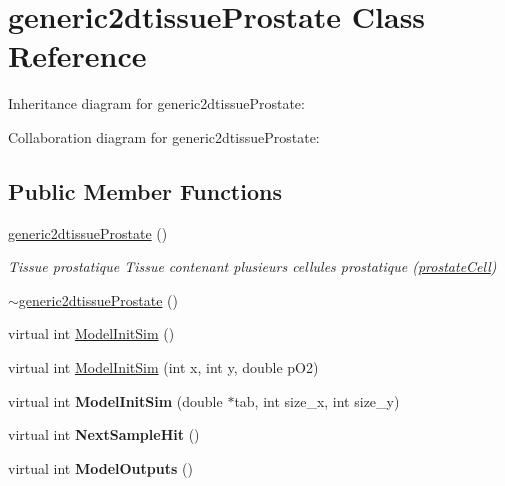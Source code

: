 \hypertarget{classgeneric2dtissueProstate}{}\section{generic2dtissue\+Prostate Class Reference}
\label{classgeneric2dtissueProstate}


Inheritance diagram for generic2dtissue\+Prostate\+:


Collaboration diagram for generic2dtissue\+Prostate\+:
\subsection*{Public Member Functions}
\begin{DoxyCompactItemize}
\item 
\hyperlink{classgeneric2dtissueProstate_a87b6996ac3e15c4a864c2d0c56f9f985}{generic2dtissue\+Prostate} ()
\begin{DoxyCompactList}\small\item\em Tissue prostatique Tissue contenant plusieurs cellules prostatique (\hyperlink{classprostateCell}{prostate\+Cell}) \end{DoxyCompactList}\item 
\hyperlink{classgeneric2dtissueProstate_a5bf1c04716c29e8b55c435ff52acaa95}{$\sim$generic2dtissue\+Prostate} ()
\item 
virtual int \hyperlink{classgeneric2dtissueProstate_aa41402a161f3f2dcce6019210c8b340c}{Model\+Init\+Sim} ()
\item 
virtual int \hyperlink{classgeneric2dtissueProstate_a468777a17d961882c6541b0ad3ed7a22}{Model\+Init\+Sim} (int x, int y, double p\+O2)
\item 
virtual int {\bfseries Model\+Init\+Sim} (double $\ast$tab, int size\+\_\+x, int size\+\_\+y)\hypertarget{classgeneric2dtissueProstate_a5e8cdd6e5e1751de771d3d885ef2f783}{}\label{classgeneric2dtissueProstate_a5e8cdd6e5e1751de771d3d885ef2f783}

\item 
virtual int {\bfseries Next\+Sample\+Hit} ()\hypertarget{classgeneric2dtissueProstate_a20a001a6f42e2ec90604252fe98e844f}{}\label{classgeneric2dtissueProstate_a20a001a6f42e2ec90604252fe98e844f}

\item 
virtual int {\bfseries Model\+Outputs} ()\hypertarget{classgeneric2dtissueProstate_a3b644ce6918f287b238d64990e5bbaf7}{}\label{classgeneric2dtissueProstate_a3b644ce6918f287b238d64990e5bbaf7}


\end{DoxyCompactItemize}
